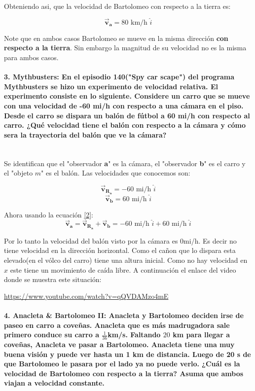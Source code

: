 \documentclass[a4paper,11pt]{article}
\theoremstyle{mytheor}
\begin{document}
Obteniendo asi, que la velocidad de Bartolomeo con respecto a la tierra es:

\begin{equation}
\vec{\textbf{v}}_{\textbf{a}}= 80 \text{ km/h } \hat{i}
\end{equation}


Note que en ambos casos Bartolomeo se mueve en la misma dirección \textbf{con respecto a la tierra}. Sin embargo la magnitud de su velocidad no es la misma para ambos casos.


\paragraph{3. Mythbusters: En el episodio 140("Spy car scape") del programa Mythbusters se hizo un experimento de velocidad relativa. El experimento consiste en lo siguiente. Considere un carro que se mueve con una velocidad de -60 mi/h con respecto a una cámara en el piso. Desde el carro se dispara un balón de fútbol a 60 mi/h con respecto al carro. ¿Qué velocidad tiene el balón con respecto a la cámara y cómo sera la trayectoria del balón que ve la cámara?\\
	\\ }

Se identifican que el  "observador \textbf{a}" es la cámara, el  "observador \textbf{b}" es el carro y el  "objeto $m$" es el balón. Las velocidades que conocemos son:


$$ \vec{\textbf{v}}_{\textbf{R}_\textbf{a}} = -60 \text{ mi/h } \hat{i} $$
$$ \vec{\textbf{v}}_{\textbf{b}} = 60 \text{ mi/h } \hat{i}$$ 

Ahora usando la ecuación \ref{2}:
\begin{equation}
\vec{\textbf{v}}_{\textbf{a}} = \vec{\textbf{v}}_{\textbf{R}_\textbf{a}} + \vec{\textbf{v}}_{\textbf{b}} = -60 \text{ mi/h }\hat{i} + 60 \text{ mi/h } \hat{i}
\end{equation}

Por lo tanto la velocidad del balón visto por la cámara es $0 $mi/h. Es decir no tiene velocidad en la dirección horizontal. Como el cañon que lo dispara esta elevado(en el vólco del carro) tiene una altura inicial. Como no hay velocidad en $x$ este tiene un movimiento de caída libre. A continuación el enlace del video donde se muestra este situación:

\url{https://www.youtube.com/watch?v=qQVDAMzo4mE}


\paragraph{4. Anacleta \& Bartolomeo II: Anacleta y Bartolomeo deciden irse de paseo en carro a coveñas. Anacleta que es más madrugadora sale primero conduce su carro a $\frac{1}{36}$km/s. Faltando $20$ km para llegar a coveñas, Anacleta ve pasar a Bartolomeo. Anacleta tiene una muy buena visión y puede ver hasta un 1 km de distancia. Luego de 20 s de que Bartolomeo le pasara por el lado ya no puede verlo. ¿Cuál es la velocidad de Bartolomeo con respecto a la tierra? Asuma que ambos viajan a velocidad constante.\\
	\\	}
\end{document}
